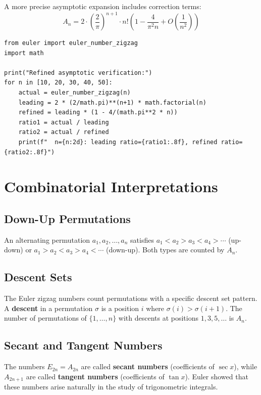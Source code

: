 A more precise asymptotic expansion includes correction terms:
\[
A_n = 2 \cdot \left(\frac{2}{\pi}\right)^{n+1} \cdot n! \left(1 - \frac{4}{\pi^2 n} + O\left(\frac{1}{n^2}\right)\right)
\]

\begin{lstlisting}[caption={Refined asymptotic verification}, label=lst:refined_asymptotic]
from euler import euler_number_zigzag
import math

print("Refined asymptotic verification:")
for n in [10, 20, 30, 40, 50]:
    actual = euler_number_zigzag(n)
    leading = 2 * (2/math.pi)**(n+1) * math.factorial(n)
    refined = leading * (1 - 4/(math.pi**2 * n))
    ratio1 = actual / leading
    ratio2 = actual / refined
    print(f"  n={n:2d}: leading ratio={ratio1:.8f}, refined ratio={ratio2:.8f}")
\end{lstlisting}

\section{Combinatorial Interpretations}

\subsection{Down-Up Permutations}

An alternating permutation $a_1, a_2, \ldots, a_n$ satisfies $a_1 < a_2 > a_3 < a_4 > \cdots$
(up-down) or $a_1 > a_2 < a_3 > a_4 < \cdots$ (down-up). Both types are counted by $A_n$.

\subsection{Descent Sets}

The Euler zigzag numbers count permutations with a specific descent set pattern.
A \textbf{descent} in a permutation $\sigma$ is a position $i$ where $\sigma(i) > \sigma(i+1)$.
The number of permutations of $\{1, \ldots, n\}$ with descents at positions $1, 3, 5, \ldots$
is $A_n$.

\subsection{Secant and Tangent Numbers}

The numbers $E_{2n} = A_{2n}$ are called \textbf{secant numbers} (coefficients of $\sec x$),
while $A_{2n+1}$ are called \textbf{tangent numbers} (coefficients of $\tan x$).
Euler showed that these numbers arise naturally in the study of trigonometric integrals.

